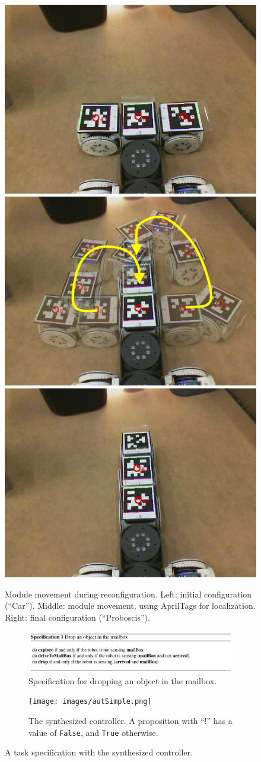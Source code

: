 \documentclass[12pt]{article}
\newcommand{\lt}{{\tt True}}
\newcommand{\lf}{{\tt False}}
\begin{document}
\begin{figure}[H]
\begin{center}
  \includegraphics[width=0.32\columnwidth]{images/reconf_start.jpg}
  \includegraphics[width=0.32\columnwidth]{images/reconf_motion.png}
  \includegraphics[width=0.32\columnwidth]{images/reconf_end.jpg}
  \caption{Module movement during reconfiguration. Left: initial configuration (``Car''). Middle: module movement, using AprilTags for localization. Right: final configuration (``Proboscis'').}
  \label{fig:reconf}
\end{center}
\end{figure}

\begin{figure}[H]
\begin{center}
\begin{subfigure}[t]{\columnwidth}
\centering
    \includegraphics[width=\textwidth]{images/spec2.png}
\caption{Specification for dropping an object in the mailbox.}
\label{fig:spec}
\end{subfigure}

\begin{subfigure}[t]{\columnwidth}
    \centering
    \texttt{[image: images/autSimple.png]}
\caption{The synthesized controller. A proposition with ``!'' has a value of \lf{}, and \lt{} otherwise.}
\label{fig:autSimple}
\end{subfigure}

\label{fig:specAut}
\caption{A task specification with the synthesized controller.}
\end{center}
\end{figure}
\end{document}
